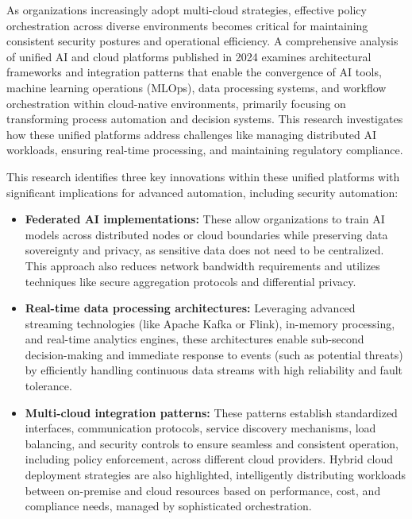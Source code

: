 \newpage

As organizations increasingly adopt multi-cloud strategies, effective policy orchestration across diverse environments becomes critical for maintaining consistent security postures and operational efficiency\cite{sushil_prabhu_prabhakaran_integration_2024}. A comprehensive analysis of unified AI and cloud platforms published in 2024 examines architectural frameworks and integration patterns that enable the convergence of AI tools, machine learning operations (MLOps), data processing systems, and workflow orchestration within cloud-native environments, primarily focusing on transforming process automation and decision systems\cite{sushil_prabhu_prabhakaran_integration_2024}. This research investigates how these unified platforms address challenges like managing distributed AI workloads, ensuring real-time processing, and maintaining regulatory compliance\cite{sushil_prabhu_prabhakaran_integration_2024}.

This research identifies three key innovations within these unified platforms with significant implications for advanced automation, including security automation:
\begin{itemize}
    \item \textbf{Federated AI implementations:} These allow organizations to train AI models across distributed nodes or cloud boundaries while preserving data sovereignty and privacy, as sensitive data does not need to be centralized. This approach also reduces network bandwidth requirements and utilizes techniques like secure aggregation protocols and differential privacy\cite{sushil_prabhu_prabhakaran_integration_2024}.
    \item \textbf{Real-time data processing architectures:} Leveraging advanced streaming technologies (like Apache Kafka or Flink), in-memory processing, and real-time analytics engines, these architectures enable sub-second decision-making and immediate response to events (such as potential threats) by efficiently handling continuous data streams with high reliability and fault tolerance\cite{sushil_prabhu_prabhakaran_integration_2024}.
    \item \textbf{Multi-cloud integration patterns:} These patterns establish standardized interfaces, communication protocols, service discovery mechanisms, load balancing, and security controls to ensure seamless and consistent operation, including policy enforcement, across different cloud providers. Hybrid cloud deployment strategies are also highlighted, intelligently distributing workloads between on-premise and cloud resources based on performance, cost, and compliance needs, managed by sophisticated orchestration\cite{sushil_prabhu_prabhakaran_integration_2024}.
\end{itemize}

